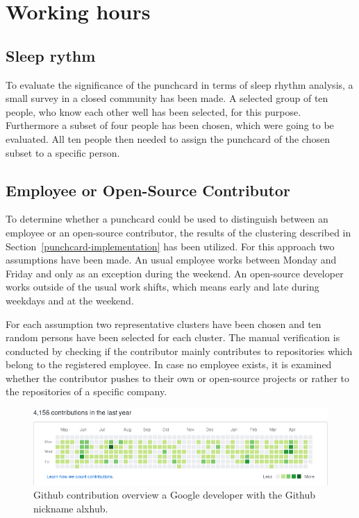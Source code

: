\section{Working hours}

\subsection{Sleep rythm}
To evaluate the significance of the punchcard in terms of sleep rhythm analysis, a small survey in a closed community has been made.
A selected group of ten people, who know each other well has been selected, for this purpose.
Furthermore a subset of four people has been chosen, which were going to be evaluated.
All ten people then needed to assign the punchcard of the chosen subset to a specific person.


\subsection{Employee or Open-Source Contributor}
To determine whether a punchcard could be used to distinguish between an employee or an open-source contributor, the results of the clustering described in Section~\ref{punchcard-implementation} has been utilized.
For this approach two assumptions have been made.
An usual employee works between Monday and Friday and only as an exception during the weekend.
An open-source developer works outside of the usual work shifts, which means early and late during weekdays and at the weekend.

For each assumption two representative clusters have been chosen and ten random persons have been selected for each cluster.
The manual verification is conducted by checking if the contributor mainly contributes to repositories which belong to the registered employee.
In case no employee exists, it is examined whether the contributor pushes to their own or open-source projects or rather to the repositories of a specific company.

\begin{figure}[H]
    \includegraphics[scale=0.6]{./graphs/contribution-overview-alxhub}
    \centering
    \caption{Github contribution overview a Google developer with the Github nickname alxhub.}\label{fig:random-sleep-rhythm}
\end{figure}

